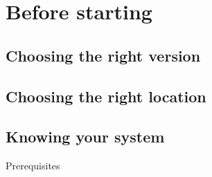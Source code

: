 \chapter{Before starting}

\section{Choosing the right version}

\section{Choosing the right location}

\section{Knowing your system}

Prerequisites

